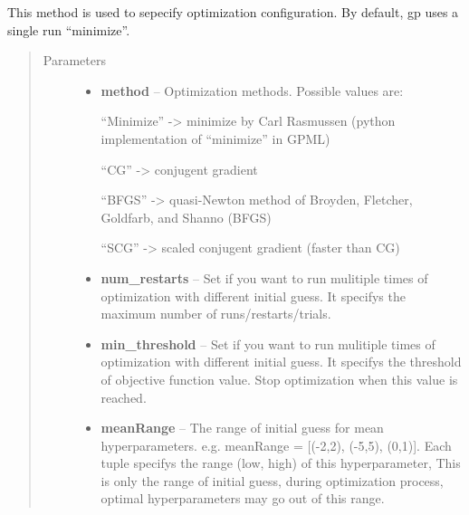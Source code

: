 \documentclass[letterpaper,10pt,english]{sphinxmanual}
\begin{document}
\begin{fulllineitems}

\begin{fulllineitems}
\label{pyGPs.Core:pyGPs.Core.gp.GP.setData}
\end{fulllineitems}


\begin{fulllineitems}
\label{pyGPs.Core:pyGPs.Core.gp.GP.setOptimizer}
This method is used to sepecify optimization configuration. By default, gp uses a single run ``minimize''.
\begin{quote}\begin{description}
\item[{Parameters}] \leavevmode\begin{itemize}
\item {} 
\textbf{method} -- 
Optimization methods. Possible values are:

``Minimize''   -\textgreater{} minimize by Carl Rasmussen (python implementation of ``minimize'' in GPML)

``CG''         -\textgreater{} conjugent gradient

``BFGS''       -\textgreater{} quasi-Newton method of Broyden, Fletcher, Goldfarb, and Shanno (BFGS)

``SCG''        -\textgreater{} scaled conjugent gradient (faster than CG)


\item {} 
\textbf{num\_restarts} -- Set if you want to run mulitiple times of optimization with different initial guess. 
It specifys the maximum number of runs/restarts/trials.

\item {} 
\textbf{min\_threshold} -- Set if you want to run mulitiple times of optimization with different initial guess. 
It specifys the threshold of objective function value. Stop optimization when this value is reached.

\item {} 
\textbf{meanRange} -- 
The range of initial guess for mean hyperparameters. 
e.g. meanRange = {[}(-2,2), (-5,5), (0,1){]}.
Each tuple specifys the range (low, high) of this hyperparameter,
This is only the range of initial guess, during optimization process, optimal hyperparameters may go out of this range.


\end{itemize}
\end{description}
\end{quote}
\end{fulllineitems}
\end{fulllineitems}
\end{document}
